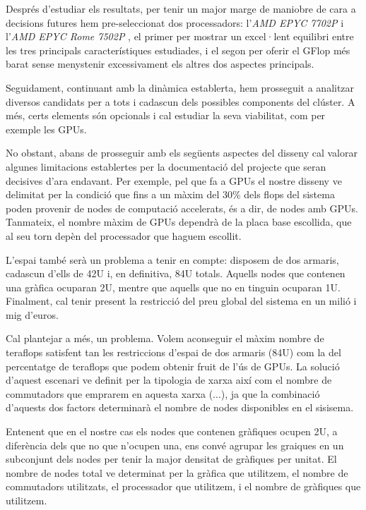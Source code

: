 \documentclass{article}
\begin{document}
Després d'estudiar els resultats, per tenir un major marge de maniobre de cara a decisions futures hem pre-seleccionat dos processadors: l'\textit{AMD EPYC 7702P} \cite{AMDE7702P} i l'\textit{AMD EPYC Rome 7502P} \cite{AMDER7502P}, el primer per mostrar un excel·lent equilibri entre les tres principals característiques estudiades, i el segon per oferir el GFlop més barat sense menystenir excessivament els altres dos aspectes principals.

Seguidament, continuant amb la dinàmica establerta, hem prosseguit a analitzar diversos candidats per a tots i cadascun dels possibles components del clúster. A més, certs elements són opcionals i cal estudiar la seva viabilitat, com per exemple les GPUs. 

No obstant, abans de prosseguir amb els següents aspectes del disseny cal valorar algunes limitacions establertes per la documentació del projecte que seran decisives d'ara endavant. Per exemple, pel que fa a GPUs el nostre disseny ve delimitat per la condició que fins a un màxim del 30\% dels flops del sistema poden provenir de nodes de computació accelerats, és a dir, de nodes amb GPUs. Tanmateix, el nombre màxim de GPUs dependrà de la placa base escollida, que al seu torn depèn del processador que haguem escollit. 

L'espai també serà un problema a tenir en compte: disposem de dos armaris, cadascun d'ells de 42U i, en definitiva, 84U totals. Aquells nodes que contenen una gràfica ocuparan 2U, mentre que aquells que no en tinguin ocuparan 1U. Finalment, cal tenir present la restricció del preu global del sistema en un milió i mig d'euros. 


Cal plantejar a més, un problema. Volem aconseguir el màxim nombre de teraflops satisfent tan les restriccions d'espai de dos armaris (84U) com la del percentatge de teraflops que podem obtenir fruit de l'ús de GPUs. La solució d'aquest escenari ve definit per la tipologia de xarxa així com el nombre de commutadors que emprarem en aquesta xarxa (...), ja que la combinació d'aquests dos factors determinarà el nombre de nodes disponibles en el sisisema.

Entenent que en el nostre cas els nodes que contenen gràfiques ocupen 2U, a diferència dels que no que n'ocupen una, ens convé agrupar les graiques en un subconjunt dels nodes per tenir la major densitat de gràfiques per unitat. El nombre de nodes total ve determinat per la gràfica que utilitzem, el nombre de commutadors utilitzats, el processador que utilitzem, i el nombre de gràfiques que utilitzem. 
\end{document}
